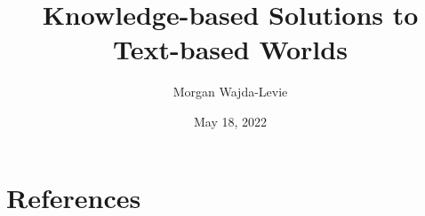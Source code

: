 \documentclass[10pt]{article}
\title{Knowledge-based Solutions to Text-based Worlds}
\author{Morgan Wajda-Levie}
\date{May 18, 2022}
\begin{document}
\maketitle



















\newpage
\section*{References}
\printbibliography
\end{document}
